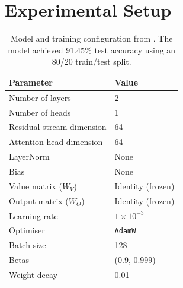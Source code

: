 \section{Experimental Setup}\label{app:exp_setup}

\begin{table}[h]
\caption{Model and training configuration from \citet{farrell2025order}. The model achieved 91.45\% test accuracy using an 80/20 train/test split.}
\label{tab:model_config}
\centering
\begin{tabular}{ll}
\toprule
\textbf{Parameter} & \textbf{Value} \\
\midrule
Number of layers & 2 \\
Number of heads & 1 \\
Residual stream dimension & 64 \\
Attention head dimension & 64 \\
LayerNorm & None \\
Bias & None \\
Value matrix ($W_V$) & Identity (frozen) \\
Output matrix ($W_O$) & Identity (frozen) \\
\midrule
Learning rate & $1 \times 10^{-3}$ \\
Optimiser & \texttt{AdamW} \\
Batch size & 128 \\
Betas & (0.9, 0.999) \\
Weight decay & 0.01 \\
\bottomrule
\end{tabular}
\end{table}

